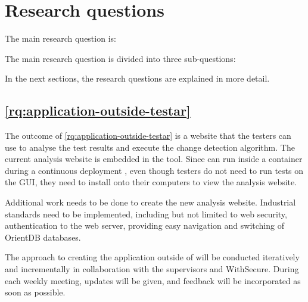 \section{Research questions} \label{research-questions}

The main research question is:

\textbf{\rqMainQuestion}

The main research question is divided into three sub-questions:

\begin{questions}
    \item \rqApplicationOutsideTestar \label{rq:application-outside-testar}
    \item \rqHowMakingChangeDetectionAlgorithm \label{rq:how-making-change-detection-algorithm}
    \item \rqHowToVisualiseResult \label{rq:how-to-visualise-result}
\end{questions}

In the next sections, the research questions are explained in more detail.

\subsection{\ref{rq:application-outside-testar} \rqApplicationOutsideTestar}

The outcome of \ref{rq:application-outside-testar} is a website that the testers can use to analyse the test results and execute the change detection algorithm. The current analysis website is embedded in the \testar tool. Since \testar can run inside a container during a continuous deployment \cite{thesisSlomp}, even though testers do not need \testar to run tests on the GUI, they need to install \testar onto their computers to view the analysis website. 

Additional work needs to be done to create the new analysis website. Industrial standards need to be implemented, including but not limited to web security, authentication to the web server, providing easy navigation and switching of OrientDB databases. 

The approach to creating the application outside of \testar will be conducted iteratively and incrementally in collaboration with the supervisors and WithSecure. During each weekly meeting, updates will be given, and feedback will be incorporated as soon as possible. 


